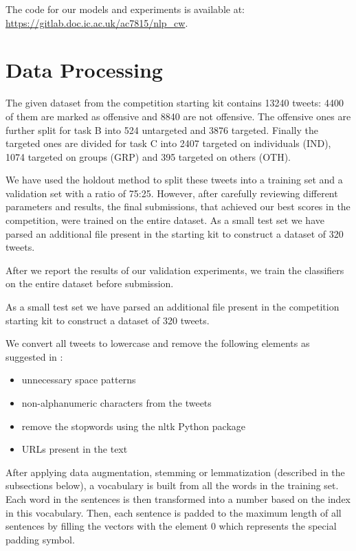 \documentclass[11pt,a4paper]{article}
\begin{document}
The code for our models and experiments is available at: \url{https://gitlab.doc.ic.ac.uk/ac7815/nlp_cw}.


\section{Data Processing}



The given dataset from the competition starting kit contains 13240 tweets: 4400 of them are marked as offensive and 8840 are not offensive. The offensive ones are further split for task B into 524 untargeted and 3876 targeted. Finally the targeted ones are divided for task C into 2407 targeted on individuals (IND), 1074 targeted on groups (GRP) and 395 targeted on others (OTH).

We have used the holdout method to split these tweets into a training set and a validation set with a ratio of 75:25. However, after carefully reviewing different parameters and results, the final submissions, that achieved our best scores in the competition, were trained on the entire dataset. As a small test set we have parsed an additional file present in the starting kit to construct a dataset of 320 tweets.

After we report the results of our validation experiments, we train the classifiers on the entire dataset before submission.

As a small test set we have parsed an additional file present in the competition starting kit to construct a dataset of 320 tweets.

We convert all tweets to lowercase and remove the following elements as suggested in \cite{preproc}:
\begin{itemize}
    \item unnecessary space patterns
    \item non-alphanumeric characters from the tweets
    \item remove the stopwords using the nltk Python package
    \item URLs present in the text
\end{itemize}

After applying data augmentation, stemming or lemmatization (described in the subsections below), a vocabulary is built from all the words in the training set. Each word in the sentences is then transformed into a number based on the index in this vocabulary. Then, each sentence is padded to the maximum length of all sentences by filling the vectors with the element 0 which represents the special padding symbol.
\end{document}
